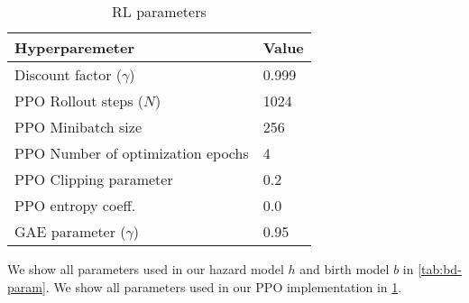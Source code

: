 \begin{table}[t]
  \centering
  \caption{RL parameters}\label{tab:rl-param}
  \begin{tabular}{ll}
  \toprule
    Hyperparemeter & Value \\
    \midrule
    Discount factor ($\gamma$) & 0.999 \\
    PPO Rollout steps ($N$) & 1024 \\
    PPO Minibatch size & 256 \\
    PPO Number of optimization epochs & 4 \\
    PPO Clipping parameter & 0.2 \\
    PPO entropy coeff. & 0.0 \\
    GAE parameter ($\gamma$) & 0.95 \\
  \end{tabular}
\end{table}

We show all parameters used in our hazard model $h$ and birth model $b$ in \cref{tab:bd-param}.
We show all parameters used in our PPO implementation in \cref{tab:rl-param}.